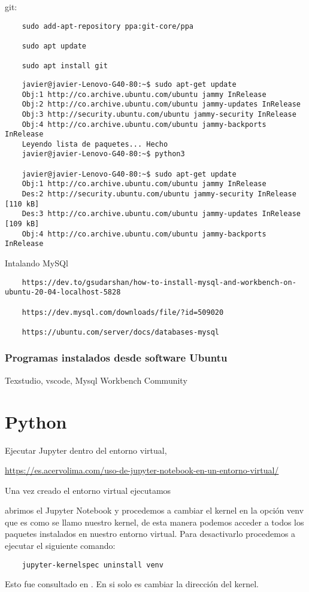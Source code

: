 git: 
\begin{verbatim}
	sudo add-apt-repository ppa:git-core/ppa 
	
	sudo apt update 
	
	sudo apt install git
\end{verbatim}
\begin{verbatim}
	javier@javier-Lenovo-G40-80:~$ sudo apt-get update
	Obj:1 http://co.archive.ubuntu.com/ubuntu jammy InRelease
	Obj:2 http://co.archive.ubuntu.com/ubuntu jammy-updates InRelease
	Obj:3 http://security.ubuntu.com/ubuntu jammy-security InRelease
	Obj:4 http://co.archive.ubuntu.com/ubuntu jammy-backports InRelease
	Leyendo lista de paquetes... Hecho
	javier@javier-Lenovo-G40-80:~$ python3
	
	javier@javier-Lenovo-G40-80:~$ sudo apt-get update
	Obj:1 http://co.archive.ubuntu.com/ubuntu jammy InRelease
	Des:2 http://security.ubuntu.com/ubuntu jammy-security InRelease [110 kB]
	Des:3 http://co.archive.ubuntu.com/ubuntu jammy-updates InRelease [109 kB]
	Obj:4 http://co.archive.ubuntu.com/ubuntu jammy-backports InRelease	
\end{verbatim}

Intalando MySQl 

\begin{verbatim}
	https://dev.to/gsudarshan/how-to-install-mysql-and-workbench-on-ubuntu-20-04-localhost-5828 
	
	https://dev.mysql.com/downloads/file/?id=509020 
	
	https://ubuntu.com/server/docs/databases-mysql
\end{verbatim}


\section{Programas instalados desde software Ubuntu}
Texstudio, vscode, Mysql Workbench Community

\part{Python}

Ejecutar Jupyter dentro del entorno virtual, 

\url{https://es.acervolima.com/uso-de-jupyter-notebook-en-un-entorno-virtual/}

Una vez creado el entorno virtual ejecutamos 

abrimos el Jupyter Notebook y procedemos a cambiar el kernel en la opci\'on venv que es como se llamo nuestro kernel, de esta manera podemos acceder a todos los paquetes instalados en nuestro entorno virtual. Para desactivarlo procedemos a ejecutar el siguiente comando: 
\begin{verbatim}
	jupyter-kernelspec uninstall venv
\end{verbatim}
Esto fue consultado en \cite{JupyterEnviroments}.
En si solo es cambiar la direcci\'on del kernel.

